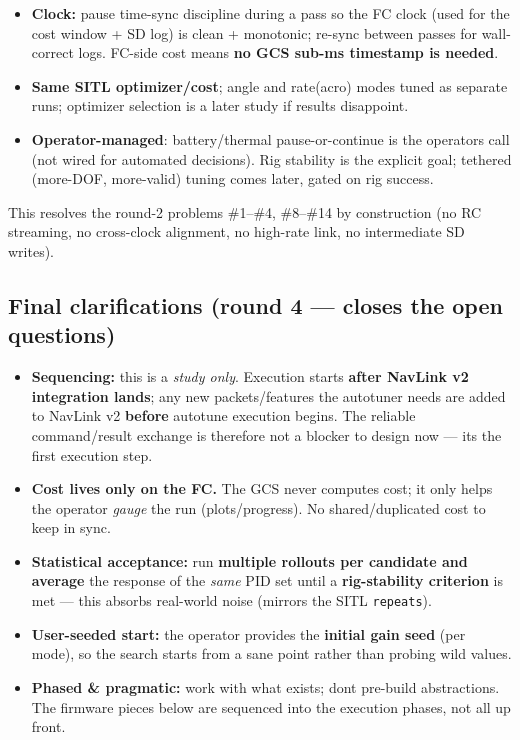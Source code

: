 \documentclass[
  11pt,
]{article}
\providecommand{\tightlist}{%
  \setlength{\itemsep}{0pt}\setlength{\parskip}{0pt}}
\begin{document}
\begin{itemize}
\item
  \textbf{Clock:} pause time-sync discipline during a pass so the FC
  clock (used for the cost window + SD log) is clean + monotonic;
  re-sync between passes for wall-correct logs. FC-side cost means
  \textbf{no GCS sub-ms timestamp is needed}.
\item
  \textbf{Same SITL optimizer/cost}; angle and rate(acro) modes tuned as
  separate runs; optimizer selection is a later study if results
  disappoint.
\item
  \textbf{Operator-managed}: battery/thermal pause-or-continue is the
  operator\textquotesingle s call (not wired for automated decisions).
  Rig stability is the explicit goal; tethered (more-DOF, more-valid)
  tuning comes later, gated on rig success.
\end{itemize}

This resolves the round-2 problems \#1--\#4, \#8--\#14 by construction
(no RC streaming, no cross-clock alignment, no high-rate link, no
intermediate SD writes).

\hypertarget{final-clarifications-round-4--closes-the-open-questions}{%
\subsection{Final clarifications (round 4 --- closes the open
questions)}\label{final-clarifications-round-4--closes-the-open-questions}}

\begin{itemize}
\tightlist
\item
  \textbf{Sequencing:} this is a \emph{study only}. Execution starts
  \textbf{after NavLink v2 integration lands}; any new packets/features
  the autotuner needs are added to NavLink v2 \textbf{before} autotune
  execution begins. The reliable command/result exchange is therefore
  not a blocker to design now --- it\textquotesingle s the first
  execution step.
\item
  \textbf{Cost lives only on the FC.} The GCS never computes cost; it
  only helps the operator \emph{gauge} the run (plots/progress). No
  shared/duplicated cost to keep in sync.
\item
  \textbf{Statistical acceptance:} run \textbf{multiple rollouts per
  candidate and average} the response of the \emph{same} PID set until a
  \textbf{rig-stability criterion} is met --- this absorbs real-world
  noise (mirrors the SITL \texttt{repeats}).
\item
  \textbf{User-seeded start:} the operator provides the \textbf{initial
  gain seed} (per mode), so the search starts from a sane point rather
  than probing wild values.
\item
  \textbf{Phased \& pragmatic:} work with what exists;
  don\textquotesingle t pre-build abstractions. The firmware pieces
  below are sequenced into the execution phases, not all up front.
\end{itemize}
\end{document}
